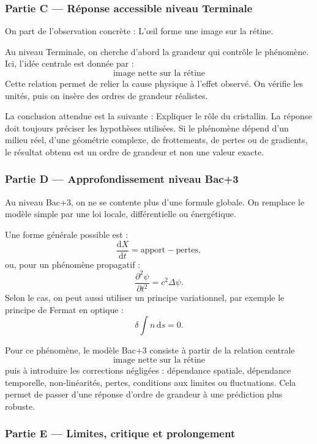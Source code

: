 \documentclass[11pt,a4paper]{article}
\begin{document}
\subsubsection*{Partie C — Réponse accessible niveau Terminale}

\begin{corrigebox}
On part de l'observation concrète : L'œil forme une image sur la rétine.

Au niveau Terminale, on cherche d'abord la grandeur qui contrôle le phénomène. Ici, l'idée centrale est donnée par :
\[
\text{image nette sur la rétine}
\]
Cette relation permet de relier la cause physique à l'effet observé. On vérifie les unités, puis on insère des ordres de grandeur réalistes.

La conclusion attendue est la suivante : Expliquer le rôle du cristallin. La réponse doit toujours préciser les hypothèses utilisées. Si le phénomène dépend d'un milieu réel, d'une géométrie complexe, de frottements, de pertes ou de gradients, le résultat obtenu est un ordre de grandeur et non une valeur exacte.
\end{corrigebox}

\subsubsection*{Partie D — Approfondissement niveau Bac+3}

\begin{approfondissementbox}
Au niveau Bac+3, on ne se contente plus d'une formule globale. On remplace le modèle simple par une loi locale, différentielle ou énergétique.

Une forme générale possible est :
\[
\frac{\mathrm d X}{\mathrm dt}=\text{apport}-\text{pertes},
\]
ou, pour un phénomène propagatif :
\[
\frac{\partial^2 \psi}{\partial t^2}=c^2\Delta\psi.
\]
Selon le cas, on peut aussi utiliser un principe variationnel, par exemple le principe de Fermat en optique :
\[
\delta \int n\,\mathrm ds=0.
\]

Pour ce phénomène, le modèle Bac+3 consiste à partir de la relation centrale
\[
\text{image nette sur la rétine}
\]
puis à introduire les corrections négligées : dépendance spatiale, dépendance temporelle, non-linéarités, pertes, conditions aux limites ou fluctuations. Cela permet de passer d'une réponse d'ordre de grandeur à une prédiction plus robuste.
\end{approfondissementbox}

\subsubsection*{Partie E — Limites, critique et prolongement}
\end{document}
